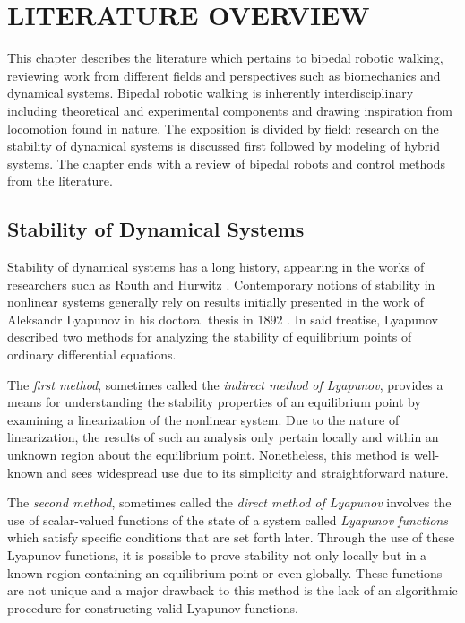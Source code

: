 \chapter{\uppercase{Literature Overview}}

This chapter describes the literature which pertains to bipedal robotic walking,
reviewing work from different fields and perspectives such as biomechanics and
dynamical systems.
%
Bipedal robotic walking is inherently interdisciplinary including theoretical
and experimental components and drawing inspiration from locomotion found in
nature.
%
The exposition is divided by field:
%
research on the stability of dynamical systems is discussed first followed by
modeling of hybrid systems.
%
The chapter ends with a review of bipedal robots and control methods from the
literature.

\section{Stability of Dynamical Systems} \label{sec:literature-stability}

Stability of dynamical systems has a long history, appearing in the works of
researchers such as Routh \cite{Routh1877} and Hurwitz \cite{Hurwitz1895}.
%
Contemporary notions of stability in nonlinear systems generally rely on results
initially presented in the work of Aleksandr Lyapunov in his doctoral thesis in
1892 \cite{Lyapunov1992}.
%
In said treatise, Lyapunov described two methods for analyzing the stability of
equilibrium points of ordinary differential equations.

The {\em first method}, sometimes called the {\em indirect method of Lyapunov},
provides a means for understanding the stability properties of an equilibrium
point by examining a linearization of the nonlinear system.
%
Due to the nature of linearization, the results of such an analysis only pertain
locally and within an unknown region about the equilibrium point.
%
Nonetheless, this method is well-known and sees widespread use due to its
simplicity and straightforward nature.
%

The {\em second method}, sometimes called the {\em direct method of Lyapunov}
involves the use of scalar-valued functions of the state of a system called {\em
  Lyapunov functions} which satisfy specific conditions that are set forth
later.
%
Through the use of these Lyapunov functions, it is possible to prove
stability not only locally but in a known region containing an equilibrium point
or even globally.
%
These functions are not unique and a major drawback to this method is the lack
of an algorithmic procedure for constructing valid Lyapunov functions.

